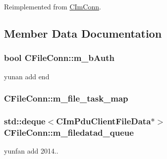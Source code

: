 Reimplemented from \hyperlink{class_c_im_conn_a6015911abda030c60baf840f5aa3c42b}{C\+Im\+Conn}.



\subsection{Member Data Documentation}
\hypertarget{class_c_file_conn_ad58386b46f20db0b313eee70d7502961}{}
\subsubsection[{m\+\_\+b\+Auth}]{\setlength{\rightskip}{0pt plus 5cm}bool C\+File\+Conn\+::m\+\_\+b\+Auth\hspace{0.3cm}{\ttfamily [private]}}\label{class_c_file_conn_ad58386b46f20db0b313eee70d7502961}


yunan add end 

\hypertarget{class_c_file_conn_a2fcf9487a3579adb28c9584db14a63c8}{}
\subsubsection[{m\+\_\+file\+\_\+task\+\_\+map}]{ C\+File\+Conn\+::m\+\_\+file\+\_\+task\+\_\+map\hspace{0.3cm}{\ttfamily [private]}}\label{class_c_file_conn_a2fcf9487a3579adb28c9584db14a63c8}
\hypertarget{class_c_file_conn_a8e74bcaff86d11aa758e089837b67d82}{}
\subsubsection[{m\+\_\+filedatad\+\_\+queue}]{\setlength{\rightskip}{0pt plus 5cm}std\+::deque$<${\bf C\+Im\+Pdu\+Client\+File\+Data}$\ast$$>$ C\+File\+Conn\+::m\+\_\+filedatad\+\_\+queue\hspace{0.3cm}{\ttfamily [private]}}\label{class_c_file_conn_a8e74bcaff86d11aa758e089837b67d82}


yunfan add 2014.. 

